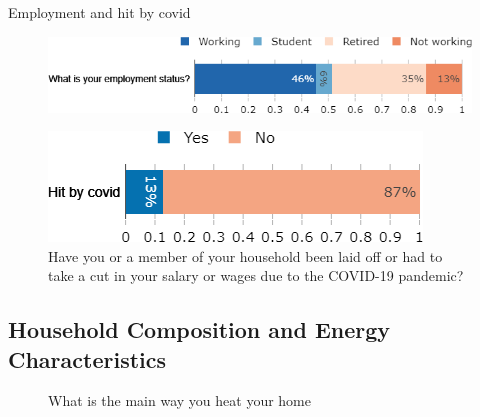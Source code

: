 \begin{framefont}{\small}
\begin{frame}{Employment and hit by covid}%
\begin{figure}[h!]
\centering
\captionsetup{justification=centering}
\caption{What is your employment status?}
\includegraphics[width=.7\paperwidth]{../figures/FR/employment_status_FR.png} \\
\vspace{.5cm}
\caption{Have you or a member of your household been laid off or had to take a cut in your salary or wages due to the COVID-19 pandemic?}
\includegraphics[width=.48\paperwidth]{../figures/FR/hit_by_covid_FR.png}
\end{figure}
\end{frame}



\subsection{Household Composition and Energy Characteristics}
\begin{frame}{}%
\begin{figure}[h!]
\caption{What is the main way you heat your home}


\end{figure}
\end{frame}
\end{framefont}
